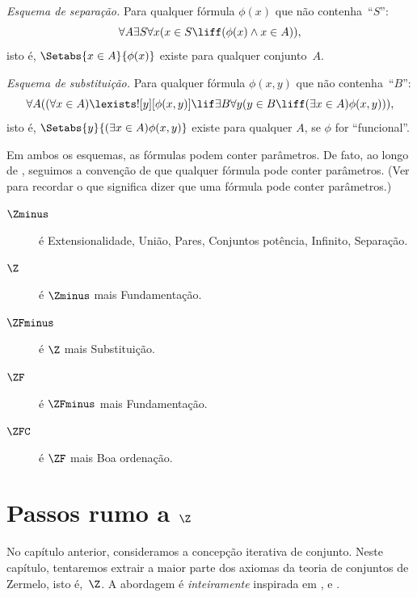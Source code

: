 \begin{defish}
\emph{Esquema de separação.}
Para qualquer fórmula $\phi(x)$ que não contenha~``$S$'':
\[
\forall A \exists S \forall x(x \in S \liff (\phi(x) \land x \in A)),
\]
isto é, $\Setabs{x \in A}{\phi(x)}$ existe para qualquer conjunto~$A$.
\end{defish}

\begin{defish}
\emph{Esquema de substituição.} Para qualquer fórmula $\phi(x, y)$ que não contenha~``$B$'':
\[
\forall A((\forall x \in A)\lexists![y][\phi(x,y)] \lif \exists B \forall y (y \in B \liff (\exists x \in A)\phi(x,y))),
\]
isto é, $\Setabs{y}{(\exists x \in A)\phi(x,y)}$ existe para qualquer $A$, se $\phi$ for ``funcional''.
\end{defish}

Em ambos os esquemas, as fórmulas podem conter parâmetros. De fato,
ao longo de , seguimos a convenção de que qualquer
fórmula pode conter parâmetros. (Ver
 para recordar o que significa dizer
que uma fórmula pode conter parâmetros.)

\begin{description}
\item[$\Zminus$] é Extensionalidade, União, Pares, Conjuntos potência, Infinito, Separação.
\item[$\Z$] é $\Zminus$ mais Fundamentação.
\item[$\ZFminus$] é $\Z$ mais Substituição.
\item[$\ZF$] é $\ZFminus$ mais Fundamentação.
\item[$\ZFC$] é $\ZF$ mais Boa ordenação.
\end{description}


\chapter{Passos rumo a $\Z$}

No capítulo anterior, consideramos a concepção iterativa de conjunto.
Neste capítulo, tentaremos extrair a maior parte dos axiomas da teoria de
conjuntos de Zermelo, isto é,~$\Z$. A abordagem é \emph{inteiramente}
inspirada em \citet{Boolos1971}, \citet{Scott1974} e
\citet{Shoenfield:AST}. 

\olresetchapter


